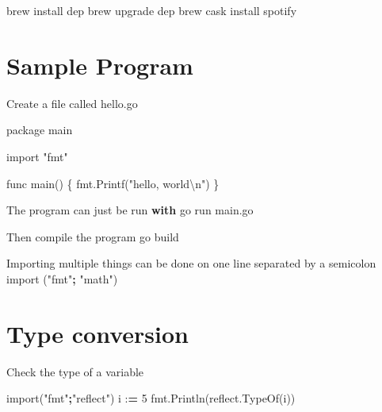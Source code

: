 \documentclass[]{book}
\newenvironment{Shaded}{\begin{snugshade}}{\end{snugshade}}
\newcommand{\BuiltInTok}[1]{#1}
\newcommand{\CharTok}[1]{\textcolor[rgb]{0.31,0.60,0.02}{#1}}
\newcommand{\ControlFlowTok}[1]{\textcolor[rgb]{0.13,0.29,0.53}{\textbf{#1}}}
\newcommand{\DecValTok}[1]{\textcolor[rgb]{0.00,0.00,0.81}{#1}}
\newcommand{\ExtensionTok}[1]{#1}
\newcommand{\ImportTok}[1]{#1}
\newcommand{\NormalTok}[1]{#1}
\newcommand{\OperatorTok}[1]{\textcolor[rgb]{0.81,0.36,0.00}{\textbf{#1}}}
\newcommand{\StringTok}[1]{\textcolor[rgb]{0.31,0.60,0.02}{#1}}
\begin{document}
\begin{Shaded}
\begin{Highlighting}[]
\ExtensionTok{brew}\NormalTok{ install dep}
\ExtensionTok{brew}\NormalTok{ upgrade dep}
\ExtensionTok{brew}\NormalTok{ cask install spotify}
\end{Highlighting}
\end{Shaded}

\hypertarget{sample-program}{%
\section{Sample Program}\label{sample-program}}

Create a file called hello.go

\begin{Shaded}
\begin{Highlighting}[]
\NormalTok{package main}

\ImportTok{import} \StringTok{"fmt"}

\NormalTok{func main() \{}
\NormalTok{    fmt.Printf(}\StringTok{"hello, world}\CharTok{\textbackslash{}n}\StringTok{"}\NormalTok{)}
\NormalTok{\}}

\NormalTok{The program can just be run }\ControlFlowTok{with}
\NormalTok{go run main.go}

\NormalTok{Then }\BuiltInTok{compile}\NormalTok{ the program}
\NormalTok{    go build}

\NormalTok{Importing multiple things can be done on one line separated by a semicolon}
    \ImportTok{import}\NormalTok{ (}\StringTok{"fmt"}\OperatorTok{;} \StringTok{"math"}\NormalTok{)}
\end{Highlighting}
\end{Shaded}

\hypertarget{type-conversion}{%
\section{Type conversion}\label{type-conversion}}

Check the type of a variable

\begin{Shaded}
\begin{Highlighting}[]
\ImportTok{import}\NormalTok{(}\StringTok{"fmt"}\OperatorTok{;}\StringTok{"reflect"}\NormalTok{)}
\NormalTok{i :}\OperatorTok{=} \DecValTok{5}
\NormalTok{fmt.Println(reflect.TypeOf(i))}
\end{Highlighting}
\end{Shaded}
\end{document}

